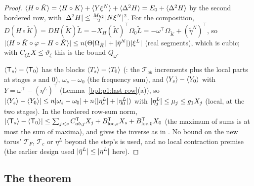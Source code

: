 \begin{proof}
\label{stepI:p2s2:st-en}
$\langle H\circ\tilde K\rangle=\langle H\circ K\rangle+\langle Y\xi^N\rangle+\langle \Delta^2H\rangle=E_0+\langle \Delta^2H\rangle$ by the second bordered row, with $\lvert \Delta^2H\rvert\le\frac{M_{h2}}2\lvert N\xi^N\rvert^2$. For the
composition, $D(H\circ\tilde K)=DH(\tilde K)\tilde L=-X_H(\tilde K)^\top\Omega_0\tilde L=-\omega^\top\Omega_{\tilde K}+(\tilde\eta^N)^\top$, so
$\lvert \langle H\circ\tilde K\circ\varphi-H\circ\tilde K\rangle\rvert\le n(\Theta\lvert \Omega_{\tilde K}\rvert+\lvert \tilde\eta^N\rvert)\lvert \xi^L\rvert$ (real segments), which is cubic; with $C_{\xi L}X\le\vartheta_\xi$ this
is the bound $Q_\omega$.

\label{stepI:p2s2:st-t}
$\langle \mathsf T_s\rangle-\langle \mathsf T_0\rangle$ has the blocks $\langle T_s\rangle-\langle T_0\rangle$ (: the $\mathcal T_{ab}$ increments plus the local parts at
stages $s$ and $0$), $\omega_s-\omega_0$ (the frequency sum), and $\langle Y_s\rangle-\langle Y_0\rangle$ with $Y=\omega^\top-(\eta^L)^\top$ (Lemma~\ref{bpI:p1:last-row}(a)), so
$\lvert \langle Y_s\rangle-\langle Y_0\rangle\rvert\le n\lvert \omega_s-\omega_0\rvert+n(\lvert \eta^L_s\rvert+\lvert \eta^L_0\rvert)$ with $\lvert \eta^L_j\rvert\le\mu_j\le g_1X_j$ (local, at the two stages). In the bordered row-sum
norm, $\lvert \langle \mathsf T_s\rangle-\langle \mathsf T_0\rangle\rvert\le\sum_{j<s}C^{\mathsf T}_{ab,j}X_j+B^{\mathsf T}_{\mathrm{loc},s}X_s+B^{\mathsf T}_{\mathrm{loc},0}X_0$ (the maximum of sums is at most the sum of
maxima), and  gives the inverse as in . No bound on the new torus' $\mathcal T_F$, $\mathcal T_c$ or $\eta^L$ beyond the
step's is used, and no local contraction premise (the earlier design used $\lvert \bar\eta^L\rvert\le\lvert \eta^L\rvert$ here).
\end{proof}

\subsection{The theorem}\label{bpI:p2s2:sec-g1}

